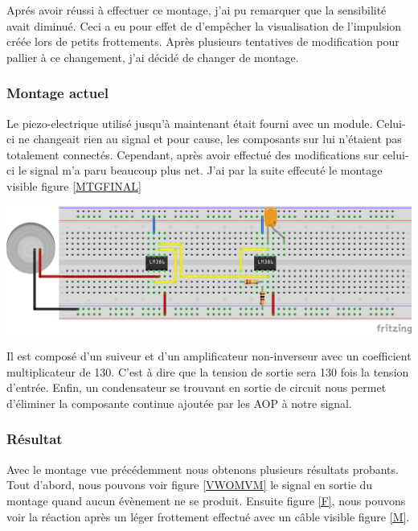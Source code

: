 \documentclass[11pt,french,a4paper]{article}
\begin{document}
Aprés avoir réussi à effectuer ce montage, j’ai pu remarquer que la sensibilité avait diminué. Ceci a eu pour effet de d’empêcher la visualisation de l’impulsion créée lors de petits frottements. Après plusieurs tentatives de modification pour pallier à ce changement, j’ai décidé de changer de montage.

\subsubsection{Montage actuel}
Le piezo-electrique utilisé jusqu’à maintenant était fourni avec un module. Celui-ci ne changeait rien au signal et pour cause, les composants sur lui n’étaient pas totalement connectés. Cependant, après avoir effectué des modifications sur celui-ci le signal m'a paru beaucoup plus net.
J’ai par la suite effecuté le montage visible figure \ref{MTGFINAL}
\\
\begin{center}	
\includegraphics[scale=0.85]{../img/mtgfinal.png}
\label{MTGFINAL}
\end{center}
Il est composé d’un suiveur et d’un amplificateur non-inverseur avec un coefficient multiplicateur de 130. C'est à dire que la tension de sortie sera 130 fois la tension d'entrée. Enfin, un condensateur se trouvant en sortie de circuit nous permet d’éliminer la composante continue ajoutée par les AOP à notre signal.


\subsubsection{Résultat}
Avec le montage vue précédemment nous obtenons plusieurs résultats probants.
Tout d'abord, nous pouvons voir figure \ref{VWOMVM} le signal en sortie du montage quand aucun évènement ne se produit.
Ensuite figure \ref{F}, nous pouvons voir la réaction après un léger frottement effectué avec un câble visible figure \ref{M}. 
\end{document}
